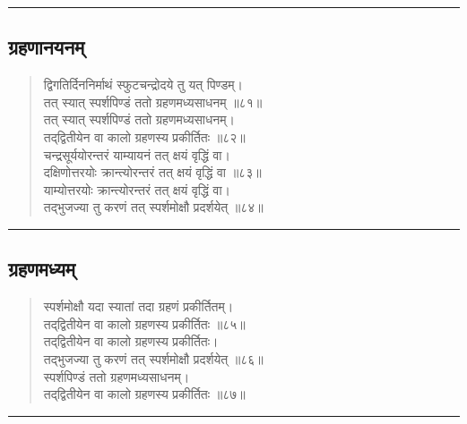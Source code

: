 \documentclass[11pt,a4paper]{article}
\newcommand{\longline}{\noindent\rule{\textwidth}{0.4pt}}
\newcommand{\dev}[1]{{\devanagarifont #1}}
\newenvironment{shloka}{%
  \begin{quote}
  \small
  \setlength{\leftmargin}{2em}
  \devanagarifont
}{\end{quote}}
\newcommand{\skt}[1]{{\devanagarifont #1}}
\begin{document}
\longline

\subsection{\dev{ग्रहणानयनम्}}

\begin{shloka}
\skt{द्विगतिर्दिननिर्माथं स्फुटचन्द्रोदये तु यत् पिण्डम्।}\\
\skt{तत् स्यात् स्पर्शपिण्डं ततो ग्रहणमध्यसाधनम् ॥८१॥}\\[0.3em]
\skt{तत् स्यात् स्पर्शपिण्डं ततो ग्रहणमध्यसाधनम्।}\\
\skt{तद्‌द्वितीयेन वा कालो ग्रहणस्य प्रकीर्तितः ॥८२॥}\\[0.3em]
\skt{चन्द्रसूर्ययोरन्तरं याम्यायनं तत् क्षयं वृद्धिं वा।}\\
\skt{दक्षिणोत्तरयोः क्रान्त्योरन्तरं तत् क्षयं वृद्धिं वा ॥८३॥}\\[0.3em]
\skt{याम्योत्तरयोः क्रान्त्योरन्तरं तत् क्षयं वृद्धिं वा।}\\
\skt{तद्‌भुजज्या तु करणं तत् स्पर्शमोक्षौ प्रदर्शयेत् ॥८४॥}
\end{shloka}

\longline

\subsection{\dev{ग्रहणमध्यम्}}

\begin{shloka}
\skt{स्पर्शमोक्षौ यदा स्यातां तदा ग्रहणं प्रकीर्तितम्।}\\
\skt{तद्‌द्वितीयेन वा कालो ग्रहणस्य प्रकीर्तितः ॥८५॥}\\[0.3em]
\skt{तद्‌द्वितीयेन वा कालो ग्रहणस्य प्रकीर्तितः।}\\
\skt{तद्‌भुजज्या तु करणं तत् स्पर्शमोक्षौ प्रदर्शयेत् ॥८६॥}\\[0.3em]
\skt{स्पर्शपिण्डं ततो ग्रहणमध्यसाधनम्।}\\
\skt{तद्‌द्वितीयेन वा कालो ग्रहणस्य प्रकीर्तितः ॥८७॥}
\end{shloka}

\longline

\end{document}
